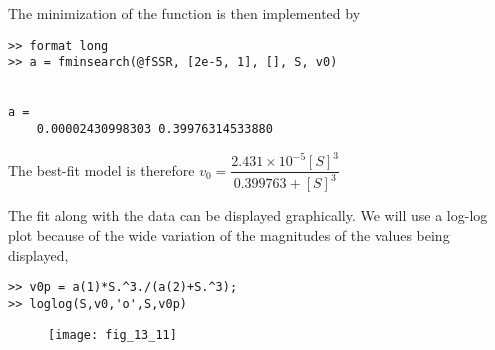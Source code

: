 \documentclass[../main.tex]{subfiles}
\begin{document}
	\bigbreak
The minimization of the function is then implemented by 
\begin{lstlisting}[numbers=none]
>> format long
>> a = fminsearch(@fSSR, [2e-5, 1], [], S, v0)


a =
	0.00002430998303 0.39976314533880 
\end{lstlisting}
	\bigbreak
The best-fit model is therefore
	\bigbreak
$v_{0}=\dfrac{2.431 \times 10^{-5}[S]^{3}}{0.399763+[S]^{3}}$
	\bigbreak
\begin{blockquote}
The fit along with the data can be displayed graphically. We will use a log-log plot because
of the wide variation of the magnitudes of the values being displayed,
\end{blockquote}
	\bigbreak
\begin{lstlisting}[numbers=none]
>> v0p = a(1)*S.^3./(a(2)+S.^3);
>> loglog(S,v0,'o',S,v0p) 
\end{lstlisting}
	\begin{figure}[H]
		\texttt{[image: fig\_13\_11]}
		\label{fig:fig_13_11}
	\end{figure}
	\bigbreak
\end{document}
